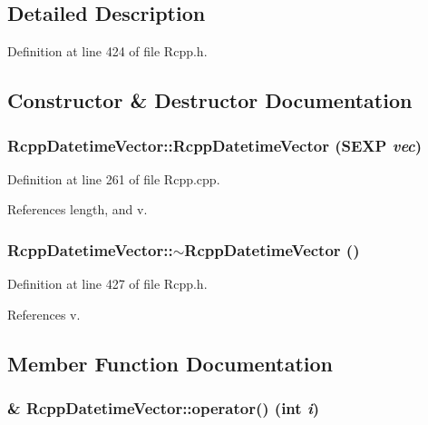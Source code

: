 \subsection{Detailed Description}


Definition at line 424 of file Rcpp.h.

\subsection{Constructor \& Destructor Documentation}
\hypertarget{classRcppDatetimeVector_1c1d1e2087fdc8e7601299dc2c4fe24c}{
\subsubsection[RcppDatetimeVector]{\setlength{\rightskip}{0pt plus 5cm}RcppDatetimeVector::RcppDatetimeVector (SEXP {\em vec})}}
\label{classRcppDatetimeVector_1c1d1e2087fdc8e7601299dc2c4fe24c}




Definition at line 261 of file Rcpp.cpp.

References length, and v.\hypertarget{classRcppDatetimeVector_81d6c5daba7448058a2f896841ddeb3a}{
\subsubsection[$\sim$RcppDatetimeVector]{\setlength{\rightskip}{0pt plus 5cm}RcppDatetimeVector::$\sim$RcppDatetimeVector ()}}
\label{classRcppDatetimeVector_81d6c5daba7448058a2f896841ddeb3a}




Definition at line 427 of file Rcpp.h.

References v.

\subsection{Member Function Documentation}
\hypertarget{classRcppDatetimeVector_2ffa33b5231a7975652e1e2498d0e16a}{
\subsubsection[operator()]{\& RcppDatetimeVector::operator() (int {\em i})}}
\label{classRcppDatetimeVector_2ffa33b5231a7975652e1e2498d0e16a}




